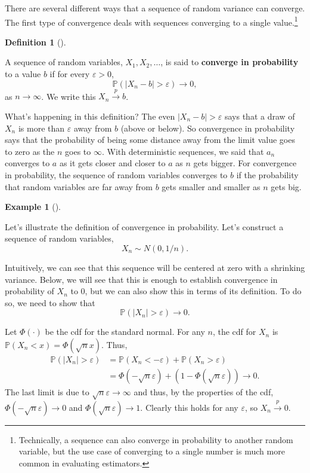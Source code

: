 \documentclass[
  letterpaper,
  DIV=11,
  numbers=noendperiod]{scrreprt}
\renewcommand{\P}{\mathbb{P}}
\newcommand{\inprob}{\overset{p}{\to}}
\theoremstyle{definition}
\newtheorem{example}{Example}[chapter]
\theoremstyle{definition}
\newtheorem{definition}{Definition}[chapter]
\theoremstyle{plain}
\theoremstyle{remark}
\begin{document}
There are several different ways that a sequence of random variance can
converge. The first type of convergence deals with sequences converging
to a single value.\footnote{Technically, a sequence can also converge in
  probability to another random variable, but the use case of converging
  to a single number is much more common in evaluating estimators.}

\begin{definition}[]\protect\hypertarget{def-inprob}{}\label{def-inprob}

A sequence of random variables, \(X_1, X_2, \ldots\), is said to
\textbf{converge in probability} to a value \(b\) if for every
\(\varepsilon > 0\), \[
\P(|X_n - b| > \varepsilon) \rightarrow 0,
\] as \(n\rightarrow \infty\). We write this \(X_n \inprob b\).

\end{definition}

What's happening in this definition? The even
\(|X_n - b| > \varepsilon\) says that a draw of \(X_n\) is more than
\(\varepsilon\) away from \(b\) (above or below). So convergence in
probability says that the probability of being some distance away from
the limit value goes to zero as the \(n\) goes to \(\infty\). With
deterministic sequences, we said that \(a_n\) converges to \(a\) as it
gets closer and closer to \(a\) as \(n\) gets bigger. For convergence in
probability, the sequence of random variables converges to \(b\) if the
probability that random variables are far away from \(b\) gets smaller
and smaller as \(n\) gets big.

\begin{example}[]\protect\hypertarget{exm-inprob}{}\label{exm-inprob}

Let's illustrate the definition of convergence in probability. Let's
construct a sequence of random variables, \[
X_n \sim N(0, 1/n).
\]

Intuitively, we can see that this sequence will be centered at zero with
a shrinking variance. Below, we will see that this is enough to
establish convergence in probability of \(X_n\) to 0, but we can also
show this in terms of its definition. To do so, we need to show that \[
\P(|X_n| > \varepsilon) \to 0.
\]

Let \(\Phi(\cdot)\) be the cdf for the standard normal. For any \(n\),
the cdf for \(X_n\) is \(\P(X_{n} < x) = \Phi(\sqrt{n}x)\). Thus, \[
\begin{aligned}
\P(|X_n| > \varepsilon) &= \P(X_n < -\varepsilon) + \P(X_n > \varepsilon) \\ &= \Phi(-\sqrt{n}\varepsilon) + (1 - \Phi(\sqrt{n}\varepsilon)) \to 0.
\end{aligned}
\] The last limit is due to \(\sqrt{n}\varepsilon \to \infty\) and thus,
by the properties of the cdf, \(\Phi(-\sqrt{n}\varepsilon) \to 0\) and
\(\Phi(\sqrt{n}\varepsilon) \to 1\). Clearly this holds for any
\(\varepsilon\), so \(X_n \inprob 0\).

\end{example}
\end{document}

